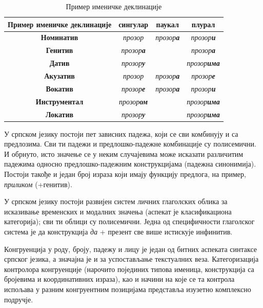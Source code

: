 \begin{multicols}{2}
\begin{table}[ht]
\begin{center}
\begin{tabular}{|c|c|c|c|}
\hline
{\textbf{Пример именичке деклинације}} & {\textbf{сингулар}} & {\textbf{паукал}} & {\textbf{плурал}} \\
\hline
{\textbf{Номинатив}} & \textit{прозор} & \textit{прозор\textbf{а}} & \textit{прозор\textbf{и}} \\
\hline
{\textbf{Генитив}} & \textit{прозор\textbf{а}} & & \textit{прозор\textbf{а}} \\
\hline
{\textbf{Датив}} & \textit{прозор\textbf{у}} & & \textit{прозор\textbf{има}} \\
\hline
{\textbf{Акузатив}} & \textit{прозор} & \textit{прозор\textbf{а}} & \textit{прозор\textbf{е}} \\
\hline
{\textbf{Вокатив}} & \textit{прозор\textbf{е}} & \textit{прозор\textbf{а}} & \textit{прозор\textbf{и}} \\
\hline
{\textbf{Инструментал}} & \textit{прозор\textbf{ом}} & & \textit{прозор\textbf{има}} \\
\hline
{\textbf{Локатив}} & \textit{прозор\textbf{у}} & & \textit{прозор\textbf{има}} \\
\hline
\end{tabular}
\end{center}
\caption{Пример именичке деклинације}
\label{imenicka_deklinacija}
\end{table}

У српском језику постоји пет зависних падежа, који се сви комбинују и са предлозима. Сви ти падежи и предлошко-падежне комбинације су полисемични. И обрнуто, исто значење се у неким случајевима може исказати различитим падежима односно предлошко-падежним конструкцијама (падежна синонимија). Постоји такође и један број израза који имају функцију предлога, на пример, \textit{приликом} (+генитив).

У српском језику постоји развијен систем личних глаголских облика за исказивање временских и модалних значења (аспекат је класификациона категорија); сви ти облици су полисемични. Једна од специфичности глаголског система је да конструкција \textit{да} + презент све више истискује инфинитив.

Конгруенција у роду, броју, падежу и лицу је један од битних аспеката синтаксе српског језика, а значајна је и за успостављање текстуалних веза. Категоризација контролора конгруенције (нарочито појединих типова именица, конструкција са бројевима и координативних  израза), као и начини на које се та контрола испољава у разним конгруентним позицијама представља и\-зу\-зе\-тно комплексно подручје.


\end{multicols}
